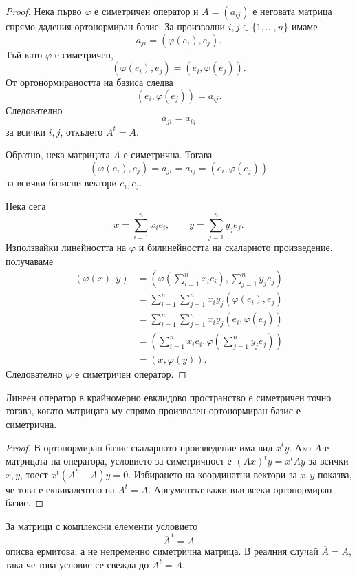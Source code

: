 \begin{proof}
Нека първо $\varphi$ е симетричен оператор и $A=(a_{ij})$ е неговата матрица спрямо дадения ортонормиран базис. За произволни $i,j\in\{1,\ldots,n\}$ имаме
\[
a_{ji}=(\varphi(e_i),e_j).
\]
Тъй като $\varphi$ е симетричен,
\[
(\varphi(e_i),e_j)=(e_i,\varphi(e_j)).
\]
От ортонормираността на базиса следва
\[
(e_i,\varphi(e_j))=a_{ij}.
\]
Следователно
\[
a_{ji}=a_{ij}
\]
за всички $i,j$, откъдето $A^t=A$.

Обратно, нека матрицата $A$ е симетрична. Тогава
\[
(\varphi(e_i),e_j)=a_{ji}=a_{ij}=(e_i,\varphi(e_j))
\]
за всички базисни вектори $e_i,e_j$.

Нека сега
\[
x=\sum_{i=1}^n x_i e_i,\qquad
y=\sum_{j=1}^n y_j e_j.
\]
Използвайки линейността на $\varphi$ и билинейността на скаларното произведение, получаваме
\[
\begin{aligned}
(\varphi(x),y)
&=
\left(
\varphi\left(\sum_{i=1}^n x_i e_i\right),
\sum_{j=1}^n y_j e_j
\right) \\
&=
\sum_{i=1}^n\sum_{j=1}^n
x_i y_j(\varphi(e_i),e_j) \\
&=
\sum_{i=1}^n\sum_{j=1}^n
x_i y_j(e_i,\varphi(e_j)) \\
&=
\left(
\sum_{i=1}^n x_i e_i,
\varphi\left(\sum_{j=1}^n y_j e_j\right)
\right) \\
&=(x,\varphi(y)).
\end{aligned}
\]
Следователно $\varphi$ е симетричен оператор.
\end{proof}

\begin{cor}
Линеен оператор в крайномерно евклидово пространство е симетричен точно тогава, когато матрицата му спрямо произволен ортонормиран базис е симетрична.
\end{cor}

\begin{proof}
В ортонормиран базис скаларното произведение има вид $x^ty$. Ако $A$ е матрицата на оператора, условието за симетричност е $(Ax)^ty=x^tAy$ за всички $x,y$, тоест $x^t(A^t-A)y=0$. Избирането на координатни вектори за $x,y$ показва, че това е еквивалентно на $A^t=A$. Аргументът важи във всеки ортонормиран базис.
\end{proof}

\begin{supp}[Бележка]
За матрици с комплексни елементи условието
\[
\overline{A}^{\,t}=A
\]
описва ермитова, а не непременно симетрична матрица. В реалния случай $\overline{A}=A$, така че това условие се свежда до $A^t=A$.
\end{supp}

